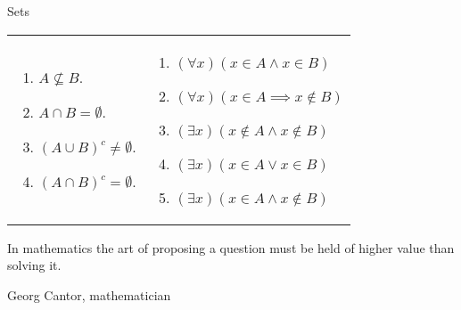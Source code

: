 \begin{section}{Sets}
\begin{problem}
\begin{tabular}{@{}ll}
\begin{minipage}[l]{3.25in}
\begin{enumerate}[label=\textrm{(\alph*)}]
\item $A \nsubseteq B$. 
\item $A \cap B= \emptyset$. 
\item $(A \cup B)^{c} \neq \emptyset$. 
\item $(A \cap B)^{c} = \emptyset$.
\end{enumerate}
\end{minipage}
 &
\begin{minipage}[l]{3.25in}
\begin{enumerate}[label=\textrm{(\roman*)}]
\item $(\forall x)(x \in A \wedge x \in B)$ 
\item $(\forall x)(x \in A \implies x \notin B)$ 
\item $(\exists x)(x \notin A \wedge x \notin B)$
\item $(\exists x)(x \in A \vee x \in B)$
\item $(\exists x)(x \in A \wedge x\notin B)$
\end{enumerate}
\end{minipage}
\end{tabular}
\end{problem}

\epigraph{In mathematics the art of proposing a question must be held of higher value than solving it.}{Georg Cantor, mathematician}

\end{section}